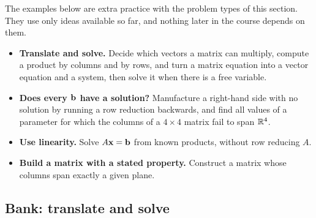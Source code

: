 \documentclass[11pt]{article}
\begin{document}
The examples below are extra practice with the problem types of this section. They use only ideas available so far, and nothing later in the course depends on them.

\begin{remark}
\begin{itemize}
  \item \textbf{Translate and solve.} Decide which vectors a matrix can multiply, compute a product by columns and by rows, and turn a matrix equation into a vector equation and a system, then solve it when there is a free variable.
  \item \textbf{Does every $\mathbf{b}$ have a solution?} Manufacture a right-hand side with no solution by running a row reduction backwards, and find all values of a parameter for which the columns of a $4\times4$ matrix fail to span $\mathbb{R}^4$.
  \item \textbf{Use linearity.} Solve $A\mathbf{x}=\mathbf{b}$ from known products, without row reducing $A$.
  \item \textbf{Build a matrix with a stated property.} Construct a matrix whose columns span exactly a given plane.
\end{itemize}
\end{remark}

\subsection*{Bank: translate and solve}
\end{document}
